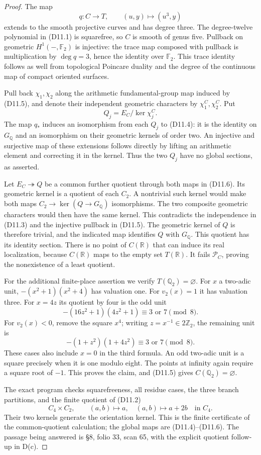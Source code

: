 \begin{proof}
The map
\[
 q:C\longrightarrow T,\qquad (u,y)\longmapsto(u^3,y)
 \tag{D11.5}
\]
extends to the smooth projective curves and has degree
three. The degree-twelve polynomial in (D11.1) is
squarefree, so $C$ is smooth of genus five. Pullback
on geometric $H^1(-,\mathbb F_2)$ is injective: the
trace map composed with pullback is multiplication
by $\deg q=3$, hence the identity over $\mathbb F_2$.
This trace identity follows as well from topological
Poincare duality and the degree of the continuous map
of compact oriented surfaces.

Pull back $\chi_1,\chi_2$ along the arithmetic
fundamental-group map induced by (D11.5), and denote
their independent geometric characters by
$\chi_1^C,\chi_2^C$. Put
\[
 Q_j=E_C/\ker\chi_j^C .
 \tag{D11.6}
\]
The map $q_*$ induces an isomorphism from each $Q_j$
to (D11.4): it is the identity on $G_{\mathbb Q}$ and
an isomorphism on their geometric kernels of order
two. An injective and surjective map of these
extensions follows directly by lifting an arithmetic
element and correcting it in the kernel. Thus the
two $Q_j$ have no global sections, as asserted.

Let $E_C\twoheadrightarrow Q$ be a common further
quotient through both maps in (D11.6). Its geometric
kernel is a quotient of each $C_2$. A nontrivial
such kernel would make both maps $C_2\to\ker(Q\to
G_{\mathbb Q})$ isomorphisms. The two composite
geometric characters would then have the same
kernel. This contradicts the independence in
(D11.3) and the injective pullback in (D11.5).
The geometric kernel of $Q$ is therefore trivial,
and the indicated map identifies $Q$ with
$G_{\mathbb Q}$. This quotient has its identity
section. There is no point of $C(\mathbb R)$ that
can induce its real localization, because
$C(\mathbb R)$ maps to the empty set $T(\mathbb R)$.
It fails $\mathcal P_C$, proving the nonexistence
of a least quotient.

For the additional finite-place assertion we verify
$T(\mathbb Q_2)=\varnothing$. For $x$ a two-adic unit,
$-(x^2+1)(x^2+4)$ has valuation one. For
$v_2(x)=1$ it has valuation three. For
$x=4z$ its quotient by four is the odd unit
\[
 -(16z^2+1)(4z^2+1)\equiv3\text{ or }7\pmod8 .
\]
For $v_2(x)<0$, remove the square $x^4$; writing
$z=x^{-1}\in2\mathbb Z_2$, the remaining unit is
\[
 -(1+z^2)(1+4z^2)\equiv3\text{ or }7\pmod8 .
\]
These cases also include $x=0$ in the third formula.
An odd two-adic unit is a square precisely when it is
one modulo eight. The points at infinity again
require a square root of $-1$. This proves the
claim, and (D11.5) gives $C(\mathbb Q_2)=\varnothing$.

The exact program checks squarefreeness, all residue
cases, the three branch partitions, and the finite
quotient of (D11.2)
\[
 C_4\times C_2,\qquad
 (a,b)\longmapsto a,\quad (a,b)\longmapsto a+2b
 \quad\text{in }C_4.
\]
Their two kernels generate the orientation kernel.
This is the finite certificate of the common-quotient
calculation; the global maps are (D11.4)--(D11.6).
The passage being answered is \S8, folio 33, scan 65,
with the explicit quotient follow-up in D(c).
\end{proof}


